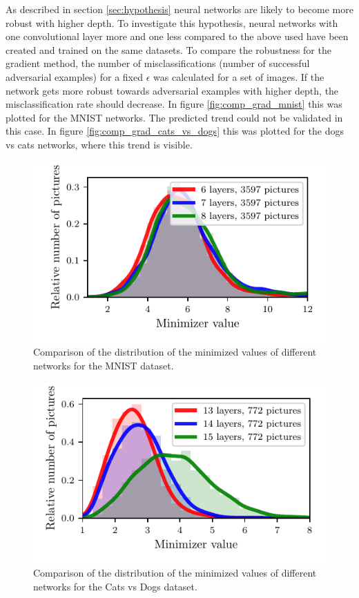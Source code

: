 \documentclass[%
 reprint,
 amsmath,amssymb,
 aps,
]{revtex4-1}
\begin{document}
As described in section \ref{sec:hypothesis} neural networks are likely to become more robust with higher depth. To investigate this hypothesis, neural networks with one convolutional layer more and one less compared to the above used have been created and trained on the same datasets. To compare the robustness for the gradient method, the number of misclassifications (number of successful adversarial examples) for a fixed $\epsilon$ was calculated for a set of images. If the network gets more robust towards adversarial examples with higher depth, the misclassification rate should decrease. In figure \ref{fig:comp_grad_mnist} this was plotted for the MNIST networks. The predicted trend could not be validated in this case. In figure \ref{fig:comp_grad_cats_vs_dogs} this was plotted for the dogs vs cats networks, where this trend is visible. \\

\begin{figure}
\centering
\showthe\columnwidth
\includegraphics[width = 1\linewidth]{figures/plot_mnist_robustness_minimizer.pdf}
\caption{Comparison of the distribution of the minimized values of different networks for the MNIST dataset.}
\label{fig:comp_min_mnist}
\end{figure}

\begin{figure}
\centering
\showthe\columnwidth
\includegraphics[width = 1\linewidth]{figures/plot_cats_vs_dogs_robustness_minimizer.pdf}
\caption{Comparison of the distribution of the minimized values of different networks for the Cats vs Dogs dataset.}
\label{fig:comp_min_cats_vs_dogs}
\end{figure}
\end{document}
